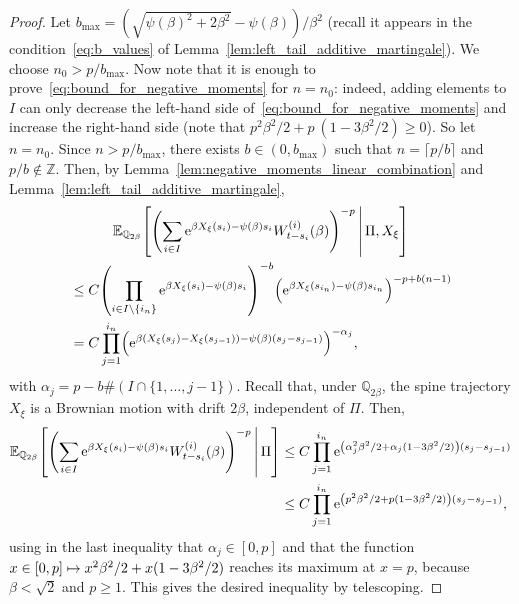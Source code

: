 \documentclass[10pt]{amsart}
\theoremstyle{definition}\newtheorem{defi}[theo]{Definition}\newtheorem{rema}[theo]{Remark}\newtheorem{exam}[theo]{Example}\newtheorem{exem}[theo]{Example}\newtheorem{nota}[theo]{Notation}
\newcommand{\e}{\mathrm{e}}
\newcommand{\E}{\mathbb{E}}
\newcommand{\Q}{\mathbb{Q}}
\newcommand{\Z}{\mathbb{Z}}
\newcommand\1{\mathds{1}}
\let\originalleft\left
\let\originalright\right
\renewcommand{\left}{\mathopen{}\mathclose\bgroup\originalleft}
\renewcommand{\right}{\aftergroup\egroup\originalright}
\let\oldmapsto\mapsto
\renewcommand*{\mapsto}{\mathchoice{\longmapsto}{\oldmapsto}{\oldmapsto}{\oldmapsto}}
\begin{document}
\begin{proof}
Let $b_{\max} = (\sqrt{\psi(\beta)^2 + 2\beta^2} - \psi(\beta))/\beta^2$ (recall it appears in the condition~\eqref{eq:b_values} of Lemma~\ref{lem:left_tail_additive_martingale}). We choose $n_0 > p/b_{\max}$. Now note that it is enough to prove~\eqref{eq:bound_for_negative_moments} for $n=n_0$: indeed, adding elements to $I$ can only decrease the left-hand side of~\eqref{eq:bound_for_negative_moments} and increase the right-hand side (note that $p^2\beta^2/2 + p~(1 - 3\beta^2/2) \geq 0$). So let $n = n_0$. Since $n > p/b_{\max}$, there exists $b \in (0,b_{\max})$ such that $n = \lceil p/b \rceil$ and $p/b \notin \Z$. Then, by Lemma~\ref{lem:negative_moments_linear_combination} and Lemma~\ref{lem:left_tail_additive_martingale},
\begin{multline*}
\E_{\Q_{2\beta}} \left[\left(\sum_{i \in I} \e^{\beta X_\xi(s_i) - \psi(\beta)s_i} W_{t - s_i}^{(i)}(\beta) \right)^{-p} \,\middle|\, \Pi, X_\xi \right]  \\
\begin{aligned}
&\leq C \left(\prod_{i \in I \setminus \{i_n\}} \e^{\beta X_\xi(s_i) - \psi(\beta)s_i} \right)^{-b} \left(\e^{\beta X_\xi(s_{i_n}) - \psi(\beta)s_{i_n}} \right)^{-p + b(n-1)}  \\
& = C \prod_{j = 1}^{i_n} \left(\e^{\beta \left(X_\xi(s_j) - X_\xi(s_{j-1})\right) - \psi(\beta)\left(s_j - s_{j-1}\right)} \right)^{-\alpha_j},
\end{aligned}
\end{multline*}
with $\alpha_j = p - b \#(I \cap \{1, \dots, j-1\})$. Recall that, under $\Q_{2\beta}$, the spine trajectory $X_\xi$ is a Brownian motion with drift $2\beta$, independent of $\Pi$. Then,
\begin{align*}
\E_{\Q_{2\beta}} \left[\left(\sum_{i \in I} \e^{\beta X_\xi(s_i) - \psi(\beta)s_i} W_{t - s_i}^{(i)}(\beta) \right)^{-p} \,\middle|\, \Pi \right] &\leq C \prod_{j = 1}^{i_n} \e^{\left(\alpha_j^2 \beta^2/2 + \alpha_j (1 - 3\beta^2/2)\right)\left(s_j - s_{j - 1}\right)}\\
&\leq C \prod_{j = 1}^{i_n} \e^{\left(p^2 \beta^2/2 + p (1 - 3\beta^2/2)\right)\left(s_j - s_{j - 1}\right)},
\end{align*}
using in the last inequality that $\alpha_j \in [0,p]$ and that the function $x \in [0,p] \mapsto x^2 \beta^2/2 + x (1 - 3\beta^2/2)$ reaches its maximum at $x=p$, because $\beta <\sqrt{2}$ and $p\geq 1$. This gives the desired inequality by telescoping.
\end{proof}
\end{document}
